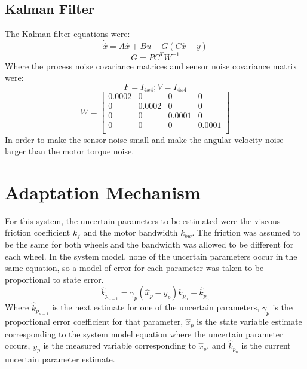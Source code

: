 \documentclass[letterpaper,12pt]{report}
\begin{document}
\subsection{Kalman Filter}
The Kalman filter equations were:
\begin{equation}
	\dot{\hat x} = A\hat x + Bu - G(C\hat x - y)
\end{equation}
\begin{equation}
	G = PC^TW^{-1}
\end{equation}
Where the process noise covariance matrices and sensor noise covariance matrix were:
\begin{equation}
	F = I_{4x4} ; V = I_{4x4}
\end{equation}
\begin{equation}
	W = 
	\begin{bmatrix}
		0.0002 & 0 & 0 & 0 \\
		0 & 0.0002 & 0 & 0 \\
		0 & 0 & 0.0001 & 0 \\
		0 & 0 & 0 & 0.0001 \\
	\end{bmatrix}
\end{equation}
In order to make the sensor noise small and make the angular velocity noise larger than the motor torque noise.

\section{Adaptation Mechanism}

For this system, the uncertain parameters to be estimated were the viscous friction coefficient $k_f$ and the motor bandwidth $k_{bw}$.
The friction was assumed to be the same for both wheels and the bandwidth was allowed to be different for each wheel. In the system model,
none of the uncertain parameters occur in the same equation, so a model of error for each parameter was taken to be proportional to state error.
\begin{equation}
	\hat k_{p_{n+1}} = \gamma_p (\hat x_p - y_p)\hat k_{p_n} + \hat k_{p_n}
\end{equation}
Where $\hat k_{p_{n+1}}$ is the next estimate for one of the uncertain parameters, $\gamma_p$ is the proportional error coefficient for that parameter, 
$\hat x_p$ is the state variable estimate corresponding to the system model equation where the uncertain parameter occurs, $y_p$ is the 
measured variable corresponding to $\hat x_p$, and $\hat k_{p_n}$ is the current uncertain parameter estimate.
\end{document}
